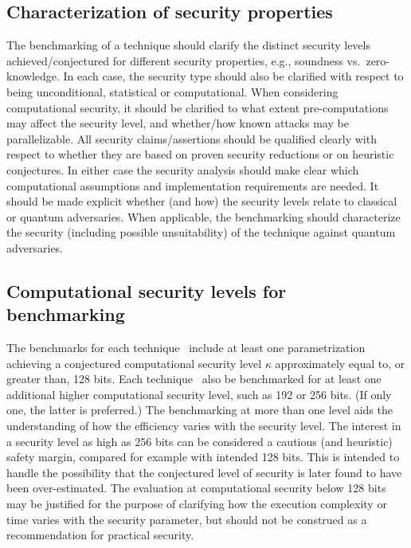 \vspace{-.5em}  %
\subsection{Characterization of security properties}
\label{security:efficiency:characterize-properties}

\vspace{-.35em}  %
The benchmarking of a technique should clarify the distinct security levels achieved/conjectured for different security properties, e.g., soundness vs.\ zero-knowledge.
In each case, the security type should also be clarified with respect to being unconditional, statistical or computational.
When considering computational security, it should be clarified to what extent pre-computations may affect the security level, and whether/how known attacks may be parallelizable.
All security claims/assertions should be qualified clearly with respect to whether they are based on proven security reductions or on heuristic conjectures. 
In either case the security analysis should make clear which computational assumptions and implementation requirements are needed. 
It should be made explicit whether (and how) the security levels relate to classical or quantum adversaries. 
When applicable, the benchmarking should characterize the security (including possible unsuitability) of the technique against quantum adversaries.



\vspace{-.5em}  %
\subsection{Computational security levels for benchmarking}
\label{security:efficiency:comp-sec-levels}

\vspace{-.35em}  %
The benchmarks for each technique \shall\ include at least one parametrization achieving a conjectured computational security level $\kappa$ approximately equal to, or greater than, 128 bits.
Each technique \should\ also be benchmarked for at least one additional higher computational security level, such as 192 or 256 bits.
(If only one, the latter is preferred.)
The benchmarking at more than one level aids the understanding of how the efficiency varies with the security level.
The interest in a security level as high as 256 bits can be considered a cautious (and heuristic) safety margin, compared for example with intended 128 bits.
This is intended to handle the possibility that the conjectured level of security is later found to have been over-estimated.
The evaluation at computational security below 128 bits may be justified for the purpose of clarifying how the execution complexity or time varies with the security parameter, but should not be construed as a recommendation for practical security.


